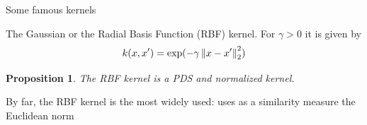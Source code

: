 \documentclass[xcolor={usenames,dvipsnames}]{beamer}
\newtheorem{prop}[theorem]{Proposition}
\begin{document}
 
 \begin{frame}{Some famous kernels}
  
 \begin{exampleblock}{The Gaussian  or the Radial Basis Function (RBF) kernel.}
 For $\gamma > 0$ it is given by
  \begin{equation*}
    k(x, x') = \exp(-\gamma \left\| x - x' \right\|_2^2)
  \end{equation*}
  \end{exampleblock}
  
  \pause
  
  \begin{prop}
   The RBF kernel is a PDS and normalized kernel.
   \end{prop}
   
   \pause
   

 By far, the RBF kernel is the most widely used: uses as a similarity measure the Euclidean norm

\end{frame}
\end{document}
